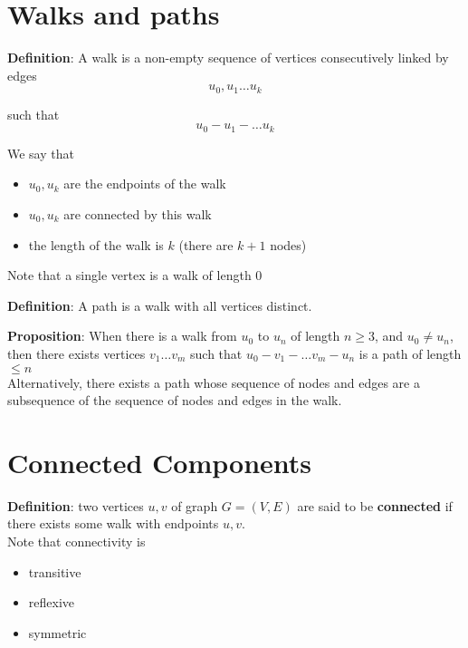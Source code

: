 \section{Walks and paths} 

\begin{framed}
   \textbf{Definition}: A walk is a non-empty sequence of vertices consecutively linked by edges
   \[
     u_0, u_1 \hdots u_k
   \] 

   such that
   \[
      u_0 - u_1 - \hdots u_k
   \] 

   We say that 
   \begin{itemize}
      \item $u_0, u_k$ are the endpoints of the walk
      \item $u_0, u_k$ are connected by this walk
      \item the length of the walk is $k$ (there are $k + 1$ nodes)
   \end{itemize}

   Note that a single vertex is a walk of length $0$
\end{framed}

\begin{framed}
   \textbf{Definition}: A path is a walk with all vertices distinct. 
\end{framed}

\begin{framed}
   \textbf{Proposition}: When there is a walk from $u_0$ to $u_n$ of length $n \geq 3$, and  $u_0 \neq u_n$, then there exists vertices $v_1 \hdots v_m$ such that $u_0 - v_1 - \hdots v_m - u_n$ is a path of length $\leq n$ \\

   Alternatively, there exists a path whose sequence of nodes and edges are a subsequence of the sequence of nodes and edges in the walk. 
\end{framed}


\section{Connected Components}

\begin{framed}
   \textbf{Definition}: two vertices $u, v $ of graph $G = (V, E)$ are said to be \textbf{connected} if there exists some walk with endpoints $u, v$. \\

   Note that connectivity is
   \begin{itemize}
      \item transitive
      \item reflexive
      \item symmetric
   \end{itemize}
\end{framed}

